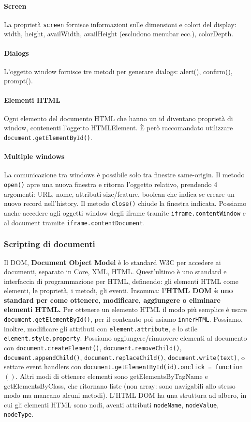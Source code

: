 \documentclass[11pt]{article}
\newcommand{\code}[1]{\texttt{#1}}
\begin{document}
\paragraph{Screen} La proprietà \code{screen} fornisce informazioni sulle dimensioni e colori del display: width, height, availWidth, availHeight (escludono menubar ecc.), colorDepth. 
\paragraph{Dialogs} L'oggetto window fornisce tre metodi per generare dialogs: alert(), confirm(), prompt().
\paragraph{Elementi HTML} Ogni elemento del documento HTML che hanno un id diventano proprietà di window, contenenti l'oggetto HTMLElement. È però raccomandato utilizzare \code{document.getElementById()}. 
\paragraph{Multiple windows} La comunicazione tra windows è possibile solo tra finestre same-origin. Il metodo \code{open()} apre una nuova finestra e ritorna l'oggetto relativo, prendendo 4 argomenti: URL, nome, attributi size/feature, boolean che indica se creare un nuovo record nell'history. Il metodo \code{close()} chiude la finestra indicata. Possiamo anche accedere agli oggetti window degli iframe tramite \code{iframe.contentWindow} e al document tramite \code{iframe.contentDocument}. 
\subsubsection{Scripting di documenti}
Il DOM, \textbf{Document Object Model} è lo standard W3C per accedere ai documenti, separato in Core, XML, HTML. Quest'ultimo è uno standard e interfaccia di programmazione per HTML, definendo: gli elementi HTML come elementi, le proprietà, i metodi, gli eventi. Insomma: \textbf{l'HTML DOM è uno standard per come ottenere, modificare, aggiungere o eliminare elementi HTML.}
Per ottenere un elemento HTML il modo più semplice è usare \code{document.getElementById()}, per il contenuto poi usiamo \code{innerHTML}. Possiamo, inoltre, modificare gli attributi con \code{element.attribute}, e lo stile \code{element.style.property}. Possiamo aggiungere/rimuovere elementi al documento con \code{document.createElement()}, \code{document.removeChild()}, \code{document.appendChild()}, \code{document.replaceChild()}, \code{document.write(text)}, o settare event handlers con \code{document.getElementById(id).onclick = function $(){}$}. Altri modi di ottenere elementi sono getElementsByTagName e getElementsByClass, che ritornano liste (non array: sono navigabili allo stesso modo ma mancano alcuni metodi). L'HTML DOM ha una struttura ad albero, in cui gli elementi HTML sono nodi, aventi attributi \code{nodeName}, \code{nodeValue}, \code{nodeType}.
\end{document}

